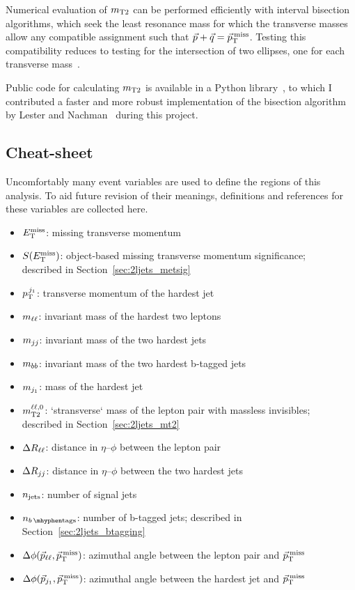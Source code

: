 Numerical evaluation of $m_\mathrm{T2}$ can be performed efficiently with interval
bisection algorithms, which seek the least resonance mass for which the
transverse masses allow any compatible assignment such that
$\vec p + \vec q = \vec p_\mathrm{T}^\mathrm{\:miss}$.
Testing this compatibility reduces to testing for the intersection of two
ellipses, one for each transverse
mass~\cite{cheng2008minimal, lester2015bisection}.

Public code for calculating $m_\mathrm{T2}$ is available in a Python
library~\cite{gillam2021mt2}, to which I contributed a faster and more robust
implementation of the bisection algorithm by
Lester and Nachman~\cite{lester2015bisection} during this project.

\clearpage
\subsection{Cheat-sheet}
Uncomfortably many event variables are used to define the regions of this
analysis.
To aid future revision of their meanings, definitions and references for these
variables are collected here.
\begin{itemize}
\item $E_\mathrm{T}^\mathrm{miss}$: missing transverse momentum
\item $S(E_\mathrm{T}^\mathrm{miss})$: object-based missing transverse momentum significance;\\
described in Section~\ref{sec:2ljets_metsig}
\item $p_\mathrm{T}^{\,j_1}$: transverse momentum of the hardest jet%
\vspace{0.5em}
\item $m_{\ell\ell}$: invariant mass of the hardest two leptons
\item $m_{jj}$: invariant mass of the two hardest jets
\item $m_{bb}$: invariant mass of the two hardest b-tagged jets
\item $m_{j_1}$: mass of the hardest jet
\item $m_\mathrm{T2}^{\ell\ell,0}$: `stransverse` mass of the lepton pair with massless invisibles;\\
described in Section~\ref{sec:2ljets_mt2}
\vspace{0.5em}
\item $\Delta R_{\ell\ell}$: distance in $\eta\textrm{--}\phi$ between the lepton pair
\item $\Delta R_{jj}$: distance in $\eta\textrm{--}\phi$ between the two hardest jets%
\vspace{0.5em}
\item $n_\mathrm{jets}$: number of signal jets
\item $\nbtag$: number of b-tagged jets;
described in Section~\ref{sec:2ljets_btagging}
\vspace{0.5em}
\item $\Delta\phi(\vec p_{\ell\ell}, \vec p_\mathrm{T}^\mathrm{\:miss})$: azimuthal angle between the lepton pair and $\vec p_\mathrm{T}^\mathrm{\:miss}$
\item $\Delta\phi(\vec p_{j_1}, \vec p_\mathrm{T}^\mathrm{\:miss})$: azimuthal angle between the hardest jet and $\vec p_\mathrm{T}^\mathrm{\:miss}$
\end{itemize}
